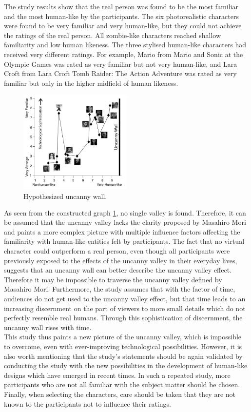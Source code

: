 The study results show that the real person was found to be the most familiar and the most human-like by the participants. The six photorealistic characters were found to be very familiar and very human-like, but they could not achieve the ratings of the real person. All zombie-like characters reached shallow familiarity and low human likeness. 
The three stylised human-like characters had received very different ratings. For example, Mario from Mario and Sonic at the Olympic Games was rated as very familiar but not very human-like, and Lara Croft from Lara Croft Tomb Raider: The Action Adventure was rated as very familiar but only in the higher midfield of human likeness. 
\newpage
\begin{figure} %
    \centering
    \includegraphics[width=0.5\textwidth]{graphics/uncanny_wall_graph.png}
    \caption{Hypothesized uncanny wall.}
    \label{fig:uncannyWallGraph}
\end{figure}
As seen from the constructed graph \ref{fig:uncannyWallGraph}, no single valley is found.
Therefore, it can be assumed that the uncanny valley lacks the clarity proposed by Masahiro Mori and paints a more complex picture with multiple influence factors affecting the familiarity with human-like entities felt by participants. The fact that no virtual character could outperform a real person, even though all participants were previously exposed to the effects of the uncanny valley in their everyday lives, suggests that an uncanny wall can better describe the uncanny valley effect. Therefore it may be impossible to traverse the uncanny valley defined by Masahiro Mori. Furthermore, the study assumes that with the factor of time, audiences do not get used to the uncanny valley effect, but that time leads to an increasing discernment on the part of viewers to more small details which do not perfectly resemble real humans. Through this sophistication of discernment, the uncanny wall rises with time.\\
This study thus paints a new picture of the uncanny valley, which is impossible to overcome, even with ever-improving technological possibilities. However, it is also worth mentioning that the study's statements should be again validated by conducting the study with the new possibilities in the development of human-like designs which have emerged in recent times. In such a repeated study, more participants who are not all familiar with the subject matter should be chosen. Finally, when selecting the characters, care should be taken that they are not known to the participants not to influence their ratings.